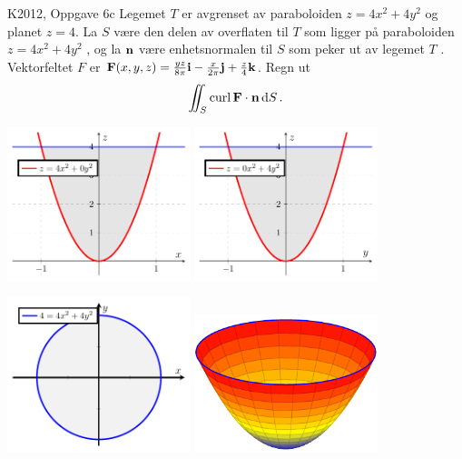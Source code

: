 \begin{frame}
  \begin{oppgave}{K2012, Oppgave 6c}
    Legemet $T$ er avgrenset av paraboloiden $z = 4x^2 +4y^2$ og planet $z = 4$.
    La $S$ være den delen av overflaten til $T$ som ligger på paraboloiden $z =
    4x^2 + 4y^2$ , og la $\mathbf{n}$ være enhetsnormalen til $S$ som peker ut av
    legemet $T$ . Vektorfeltet $F$ er
$
  \mathbf{F}(x, y, z) = \frac{yz}{8\pi}\mathbf{i} - \frac{x}{2\pi} \mathbf{j} + \frac{z}{4}\mathbf{k}
$. Regn ut 
\begin{equation*}
  \iint_S \operatorname{curl} \mathbf{F} \cdot \mathbf{n} \mathop{}\! \mathrm{d} S\mathop{}\!.
\end{equation*}
\end{oppgave}
\end{frame}
\begin{frame}
\centerline{%
\includegraphics[width=0.4\textwidth]{../img/stokes-xz}%
\includegraphics[width=0.4\textwidth]{../img/stokes-yz}}
\centerline{%
\includegraphics[width=0.4\textwidth]{../img/stokes-xy}%
\includegraphics[width=0.4\textwidth]{../img/stokes-3d}}
\end{frame}

